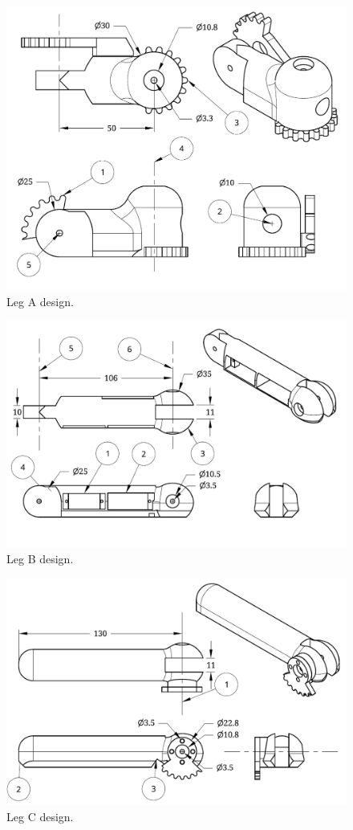 \begin{figure}[H]
\centering
\includegraphics[scale = 1]{pics/DrawingA.pdf}
\caption{Leg A design.}
\end{figure}
\begin{figure}[H]
\centering
\includegraphics[scale = 1]{pics/DrawingB.pdf}
\caption{Leg B design.}
\end{figure}
\begin{figure}[H]
\centering
\includegraphics[scale = 1]{pics/DrawingC.pdf}
\caption{Leg C design.}
\end{figure}
